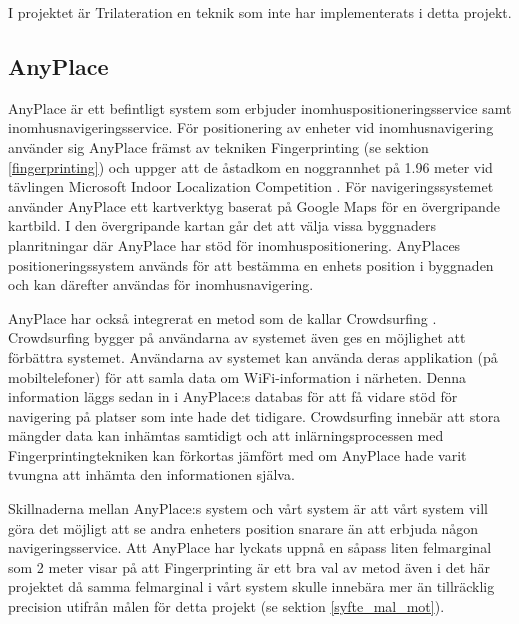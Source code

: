 \documentclass[a4paper,12pt]{article}
\begin{document}
 I projektet är Trilateration en teknik som inte har implementerats i detta projekt.


 \subsection{AnyPlace}
 AnyPlace är ett befintligt system som erbjuder inomhuspositioneringsservice samt inomhusnavigeringsservice. För positionering av enheter vid inomhusnavigering använder sig AnyPlace främst av tekniken Fingerprinting (se sektion \ref{fingerprinting}) och uppger att de åstadkom en noggrannhet på 1.96 meter vid tävlingen Microsoft Indoor Localization Competition \cite{anyplace}
 \cite{IPS_tavling}.
 För navigeringssystemet använder AnyPlace ett kartverktyg baserat på Google Maps för en övergripande kartbild. I den övergripande kartan går det att välja vissa byggnaders planritningar där AnyPlace har stöd för inomhuspositionering. AnyPlaces positioneringssystem används för att bestämma en enhets position i byggnaden och kan därefter användas för inomhusnavigering.

 AnyPlace har också integrerat en metod som de kallar Crowdsurfing \cite{anyplace}. Crowdsurfing bygger på användarna av systemet även ges en möjlighet att förbättra systemet. Användarna av systemet kan använda deras applikation (på mobiltelefoner) för att samla data om WiFi-information i närheten. Denna information läggs sedan in i AnyPlace:s databas för att få vidare stöd för navigering på platser som inte hade det tidigare. Crowdsurfing innebär att stora mängder data kan inhämtas samtidigt och att inlärningsprocessen med Fingerprintingtekniken kan förkortas jämfört med om AnyPlace hade varit tvungna att inhämta den informationen själva.

 Skillnaderna mellan AnyPlace:s system och vårt system är att vårt system vill göra det möjligt att se andra enheters position snarare än att erbjuda någon navigeringsservice. Att AnyPlace har lyckats uppnå en såpass liten felmarginal som 2 meter visar på att Fingerprinting är ett bra val av metod även i det här projektet då samma felmarginal i vårt system skulle innebära mer än tillräcklig precision utifrån målen för detta projekt (se sektion \ref{syfte_mal_mot}).

\end{document}

